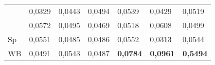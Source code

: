 \begin{table*}
\begin{center}
\begin{tabular}{|l|l|l|l|l|l|l|}
\hspace*{4mm}{\bf K}&0,0329&0,0443&0,0494&0,0539&0,0429&0,0519\\
\hspace*{4mm}{\bf S}&0,0572&0,0495&0,0469&0,0518&0,0608&0,0499\\
\hspace*{4mm}Sp&0,0551&0,0485&0,0486&0,0552&0,0313&0,0544\\
\hspace*{4mm}WB&0,0491&0,0543&0,0487&{\bf 0,0784}&{\bf 0,0961}&{\bf 0,5494}\\
\hline
\end{tabular}
\end{center}
\vspace*{-12pt}
\end{table*}


